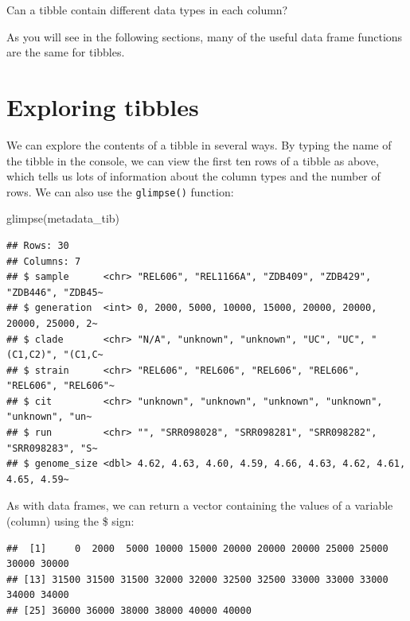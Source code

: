 \documentclass[
]{book}
\newenvironment{Shaded}{\begin{snugshade}}{\end{snugshade}}
\newcommand{\FunctionTok}[1]{\textcolor[rgb]{0.00,0.00,0.00}{#1}}
\newcommand{\NormalTok}[1]{#1}
\newcommand{\SpecialCharTok}[1]{\textcolor[rgb]{0.00,0.00,0.00}{#1}}
\begin{document}
Can a tibble contain different data types in each column?

As you will see in the following sections, many of the useful data frame functions are the same for tibbles.

\hypertarget{exploring-tibbles}{%
\section{Exploring tibbles}\label{exploring-tibbles}}

We can explore the contents of a tibble in several ways. By typing the name of the tibble in the console, we can view the first ten rows of a tibble as above, which tells us lots of information about the column types and the number of rows. We can also use the \texttt{glimpse()} function:

\begin{Shaded}
\begin{Highlighting}[]
\FunctionTok{glimpse}\NormalTok{(metadata\_tib)}
\end{Highlighting}
\end{Shaded}

\begin{verbatim}
## Rows: 30
## Columns: 7
## $ sample      <chr> "REL606", "REL1166A", "ZDB409", "ZDB429", "ZDB446", "ZDB45~
## $ generation  <int> 0, 2000, 5000, 10000, 15000, 20000, 20000, 20000, 25000, 2~
## $ clade       <chr> "N/A", "unknown", "unknown", "UC", "UC", "(C1,C2)", "(C1,C~
## $ strain      <chr> "REL606", "REL606", "REL606", "REL606", "REL606", "REL606"~
## $ cit         <chr> "unknown", "unknown", "unknown", "unknown", "unknown", "un~
## $ run         <chr> "", "SRR098028", "SRR098281", "SRR098282", "SRR098283", "S~
## $ genome_size <dbl> 4.62, 4.63, 4.60, 4.59, 4.66, 4.63, 4.62, 4.61, 4.65, 4.59~
\end{verbatim}

As with data frames, we can return a vector containing the values of a variable (column) using the \$ sign:

\begin{Shaded}
\end{Shaded}

\begin{verbatim}
##  [1]     0  2000  5000 10000 15000 20000 20000 20000 25000 25000 30000 30000
## [13] 31500 31500 31500 32000 32000 32500 32500 33000 33000 33000 34000 34000
## [25] 36000 36000 38000 38000 40000 40000
\end{verbatim}
\end{document}
